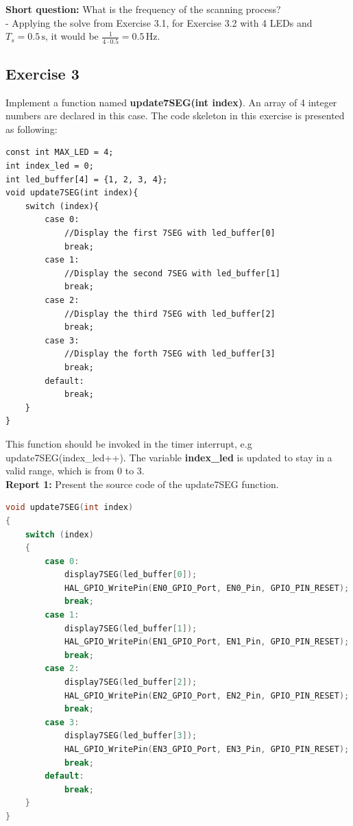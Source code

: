 \textbf{Short question: } What is the frequency of the scanning process?\\

- Applying the solve from Exercise 3.1, for Exercise 3.2 with 4 LEDs and $T_s = 0.5\,\text{s}$, it would be $\frac{1}{4 \cdot 0.5} = 0.5\,\text{Hz}$.










\newpage
\subsection{Exercise 3}
Implement a function named \textbf{update7SEG(int index)}. An array of 4 integer numbers are declared in this case. The code skeleton in this exercise is presented as following:

\begin{lstlisting}[caption=An example for your source code]
const int MAX_LED = 4;
int index_led = 0;
int led_buffer[4] = {1, 2, 3, 4};
void update7SEG(int index){
    switch (index){
        case 0:
            //Display the first 7SEG with led_buffer[0]
            break;
        case 1:
            //Display the second 7SEG with led_buffer[1]
            break;
        case 2:
            //Display the third 7SEG with led_buffer[2]
            break;
        case 3:
            //Display the forth 7SEG with led_buffer[3]
            break;
        default:
            break;
    }
}
\end{lstlisting}

This function should be invoked in the timer interrupt, e.g update7SEG(index\_led++). The variable \textbf{index\_led} is updated to stay in a valid range, which is from 0 to 3. \\

\textbf{Report 1: } Present the source code of the update7SEG function. \\

\begin{lstlisting}[language=c,caption={Source code of the update7SEG function.}]
void update7SEG(int index)
{
    switch (index)
    {
        case 0:
            display7SEG(led_buffer[0]);
            HAL_GPIO_WritePin(EN0_GPIO_Port, EN0_Pin, GPIO_PIN_RESET);
            break;
        case 1:
            display7SEG(led_buffer[1]);
            HAL_GPIO_WritePin(EN1_GPIO_Port, EN1_Pin, GPIO_PIN_RESET);
            break;
        case 2:
            display7SEG(led_buffer[2]);
            HAL_GPIO_WritePin(EN2_GPIO_Port, EN2_Pin, GPIO_PIN_RESET);
            break;
        case 3:
            display7SEG(led_buffer[3]);
            HAL_GPIO_WritePin(EN3_GPIO_Port, EN3_Pin, GPIO_PIN_RESET);
            break;
        default:
            break;
    }
}
\end{lstlisting}

